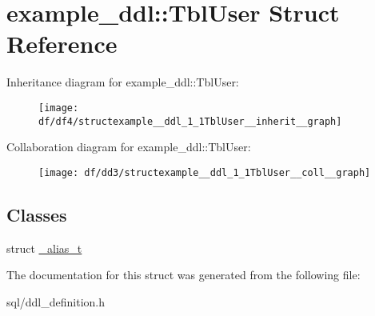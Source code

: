 \hypertarget{structexample__ddl_1_1TblUser}{}\section{example\+\_\+ddl\+:\+:Tbl\+User Struct Reference}
\label{structexample__ddl_1_1TblUser}


Inheritance diagram for example\+\_\+ddl\+:\+:Tbl\+User\+:
\nopagebreak
\begin{figure}[H]
\begin{center}
\leavevmode
\texttt{[image: df/df4/structexample\_\_ddl\_1\_1TblUser\_\_inherit\_\_graph]}
\end{center}
\end{figure}


Collaboration diagram for example\+\_\+ddl\+:\+:Tbl\+User\+:
\nopagebreak
\begin{figure}[H]
\begin{center}
\leavevmode
\texttt{[image: df/dd3/structexample\_\_ddl\_1\_1TblUser\_\_coll\_\_graph]}
\end{center}
\end{figure}
\subsection*{Classes}
\begin{DoxyCompactItemize}
\item 
struct \hyperlink{structexample__ddl_1_1TblUser_1_1__alias__t}{\+\_\+alias\+\_\+t}
\end{DoxyCompactItemize}


The documentation for this struct was generated from the following file\+:\begin{DoxyCompactItemize}
\item 
sql/ddl\+\_\+definition.\+h\end{DoxyCompactItemize}
